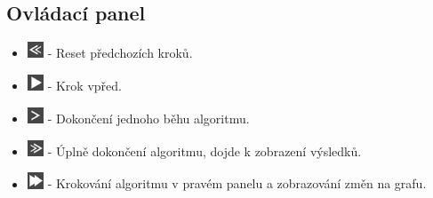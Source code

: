 \documentclass[../projekt.tex]{subfiles}
\begin{document}
\subsection{Ovládací panel}

\begin{itemize}
    \item \includegraphics[height=1.3em]{obrazky-figures/resetSmall.png} - Reset předchozích kroků.
    \item \includegraphics[height=1.3em]{obrazky-figures/playSmall.png} - Krok vpřed.
    \item \includegraphics[height=1.3em]{obrazky-figures/nextStepSmall.png} - Dokončení jednoho běhu algoritmu.
    \item \includegraphics[height=1.3em]{obrazky-figures/finishSmall.png} - Úplně dokončení algoritmu, dojde k zobrazení výsledků.
    \item \includegraphics[height=1.3em]{obrazky-figures/manualSteps.png} - Krokování algoritmu v pravém panelu a zobrazování změn na grafu.
\end{itemize}
\end{document}
